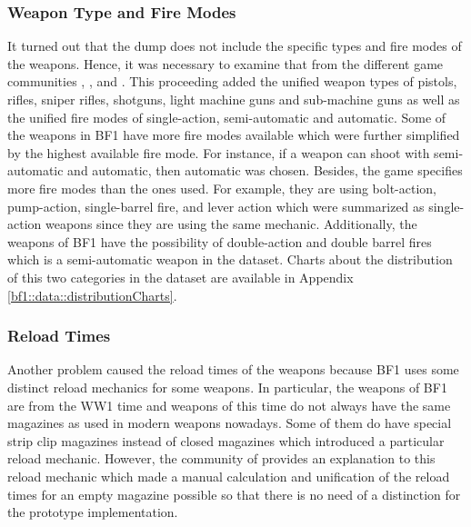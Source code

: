 \documentclass[MGS,Master,english]{twbook}%
\begin{document}
\subsubsection{Weapon Type and Fire Modes}
It turned out that the dump does not include the specific types and fire modes of the weapons. Hence, it was necessary to examine that from the different game communities \citep{symthic::bf1stats}, \citep{bf1::community1}, and \citep{bf1::community2}. This proceeding added the unified weapon types of pistols, rifles, sniper rifles, shotguns, light machine guns and sub-machine guns as well as the unified fire modes of single-action, semi-automatic and automatic. Some of the weapons in \ac{BF1} have more fire modes available which were further simplified by the highest available fire mode. For instance, if a weapon can shoot with semi-automatic and automatic, then automatic was chosen. Besides, the game specifies more fire modes than the ones used. For example, they are using bolt-action, pump-action, single-barrel fire, and lever action which were summarized as single-action weapons since they are using the same mechanic. Additionally, the weapons of BF1 have the possibility of double-action and double barrel fires which is a semi-automatic weapon in the dataset. Charts about the distribution of this two categories in the dataset are available in Appendix \ref{bf1::data::distributionCharts}. 

\subsubsection{Reload Times}
Another problem caused the reload times of the weapons because \ac{BF1} uses some distinct reload mechanics for some weapons. In particular, the weapons of BF1 are from the WW1 time and weapons of this time do not always have the same magazines as used in modern weapons nowadays. Some of them do have special strip clip magazines instead of closed magazines which introduced  a particular reload mechanic. However, the community of \citep{symthic::bf1stats} provides an explanation to this reload mechanic which made a manual calculation and unification of the reload times for an empty magazine possible so that there is no need of a distinction for the prototype implementation.
\end{document}

